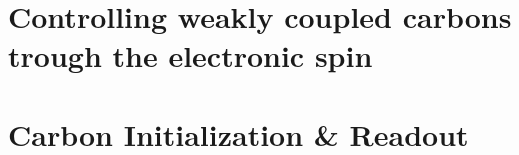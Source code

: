 \section{Controlling weakly coupled carbons trough the electronic spin}





\section{Carbon Initialization \& Readout}




